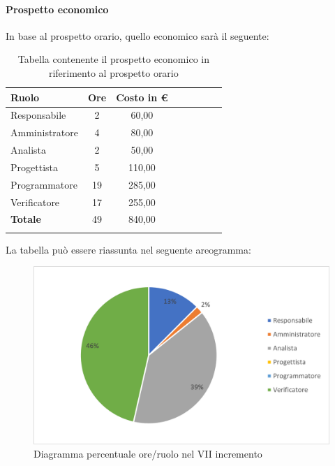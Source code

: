 \paragraph{Prospetto economico}
In base al prospetto orario, quello economico sarà il seguente:

\begin{longtable}{|l|c|c|c|c|c|c|c|}
	\hline
	\rowcolor{lighter-grayer}
	\textbf{Ruolo}  & \textbf{Ore} & \textbf{Costo in €} \\
	\hline
	\endfirsthead

	\hline
	Responsabile    & 2            & 60,00              \\
	\hline
	\hline
	Amministratore  & 4            & 80,00               \\
	\hline
	\hline
	Analista        & 2           & 50,00              \\
	\hline
	\hline
	Progettista     & 5            & 110,00                   \\
	\hline
	\hline
	Programmatore   & 19            & 285,00                   \\
	\hline
	\hline
	Verificatore    & 17           & 255,00              \\
	\hline
	\textbf{Totale} & 49           & 840,00            \\
	\hline
	\rowcolor{white}
	\caption{Tabella contenente il prospetto economico in riferimento al prospetto orario}
\end{longtable}
\pagebreak

La tabella può essere riassunta nel seguente areogramma:
\begin{figure}[H]
	\centering
	\includegraphics[width=0.8\linewidth]{res/images/preventivo/dettaglio_analisi/4-2.png}
	\caption{Diagramma percentuale ore/ruolo nel VII incremento}
	\label{fig:diagramma costi ruolo VII incremento}
\end{figure}


